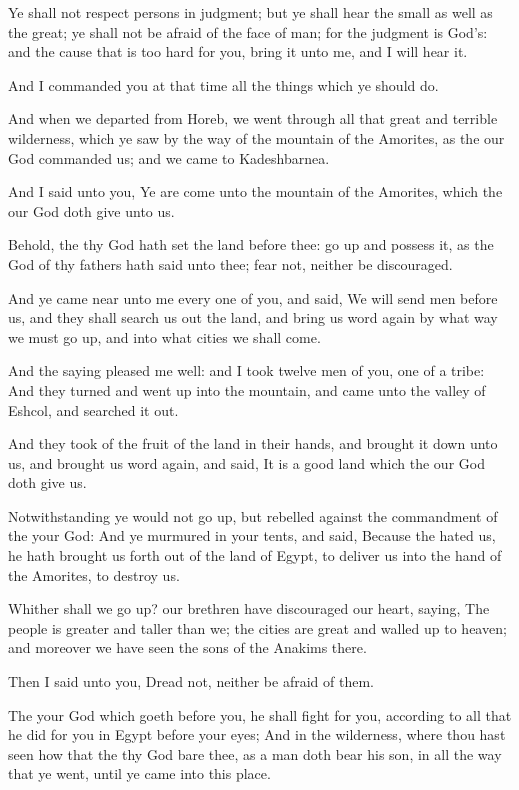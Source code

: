 \Verse Ye shall not respect persons in judgment; but ye shall hear the small as well as the great; ye shall not be afraid of the face of man; for the judgment is God's: and the cause that is too hard for you, bring it unto me, and I will hear it.

\Verse And I commanded you at that time all the things which ye should do.

\Verse And when we departed from Horeb, we went through all that great and terrible wilderness, which ye saw by the way of the mountain of the Amorites, as the \LORD our God commanded us; and we came to Kadeshbarnea.

\Verse And I said unto you, Ye are come unto the mountain of the Amorites, which the \LORD our God doth give unto us.

\Verse Behold, the \LORD thy God hath set the land before thee: go up and possess it, as the \LORD God of thy fathers hath said unto thee; fear not, neither be discouraged.

\Verse And ye came near unto me every one of you, and said, We will send men before us, and they shall search us out the land, and bring us word again by what way we must go up, and into what cities we shall come.

\Verse And the saying pleased me well: and I took twelve men of you, one of a tribe: \Verse And they turned and went up into the mountain, and came unto the valley of Eshcol, and searched it out.

\Verse And they took of the fruit of the land in their hands, and brought it down unto us, and brought us word again, and said, It is a good land which the \LORD our God doth give us.

\Verse Notwithstanding ye would not go up, but rebelled against the commandment of the \LORD your God: \Verse And ye murmured in your tents, and said, Because the \LORD hated us, he hath brought us forth out of the land of Egypt, to deliver us into the hand of the Amorites, to destroy us.

\Verse Whither shall we go up? our brethren have discouraged our heart, saying, The people is greater and taller than we; the cities are great and walled up to heaven; and moreover we have seen the sons of the Anakims there.

\Verse Then I said unto you, Dread not, neither be afraid of them.

\Verse The \LORD your God which goeth before you, he shall fight for you, according to all that he did for you in Egypt before your eyes; \Verse And in the wilderness, where thou hast seen how that the \LORD thy God bare thee, as a man doth bear his son, in all the way that ye went, until ye came into this place.

